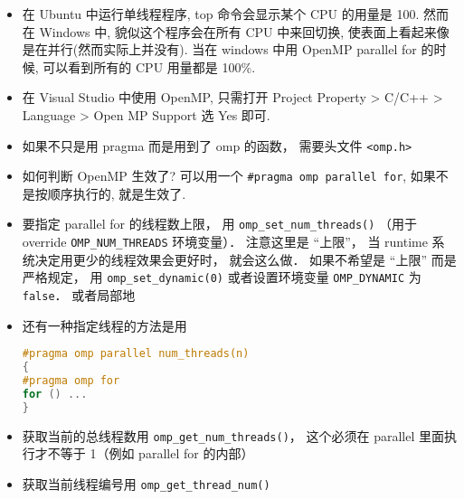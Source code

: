 
\begin{issues}
\issueDraft
\end{issues}


\begin{itemize}
\item 在 Ubuntu 中运行单线程程序, top 命令会显示某个 CPU 的用量是 100. 然而在 Windows 中, 貌似这个程序会在所有 CPU 中来回切换, 使表面上看起来像是在并行(然而实际上并没有). 当在 windows 中用 OpenMP parallel for 的时候, 可以看到所有的 CPU 用量都是 100\%.
\item 在 Visual Studio 中使用 OpenMP, 只需打开 Project Property > C/C++ > Language > Open MP Support 选 Yes 即可.
\item 如果不只是用 pragma 而是用到了 omp 的函数， 需要头文件 \verb`<omp.h>`
\item 如何判断 OpenMP 生效了? 可以用一个 \verb|#pragma omp parallel for|, 如果不是按顺序执行的, 就是生效了.

\item 要指定 parallel for 的线程数上限， 用 \verb`omp_set_num_threads()` （用于 override \verb`OMP_NUM_THREADS` 环境变量）． 注意这里是 “上限”， 当 runtime 系统决定用更少的线程效果会更好时， 就会这么做． 如果不希望是 “上限” 而是严格规定， 用 \verb`omp_set_dynamic(0)` 或者设置环境变量 \verb`OMP_DYNAMIC` 为 \verb`false`．
 或者局部地
\item 还有一种指定线程的方法是用
\begin{lstlisting}[language=cpp]
#pragma omp parallel num_threads(n)
{
#pragma omp for
for () ...
}
\end{lstlisting}
\item 获取当前的总线程数用 \verb`omp_get_num_threads()`， 这个必须在 parallel 里面执行才不等于 1（例如 parallel for 的内部）
\item 获取当前线程编号用 \verb`omp_get_thread_num()`


\end{itemize}
